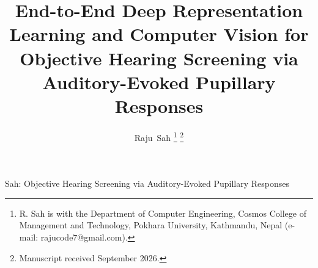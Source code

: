 \documentclass[journal]{IEEEtran}
\begin{document}
\title{End-to-End Deep Representation Learning and Computer Vision for Objective Hearing Screening via Auditory-Evoked Pupillary Responses}

\author{Raju~Sah%
\thanks{R. Sah is with the Department of Computer Engineering, Cosmos College of Management and Technology, Pokhara University, Kathmandu, Nepal (e-mail: rajucode7@gmail.com).}%
\thanks{Manuscript received September 2026.}%
}

%
{Sah: Objective Hearing Screening via Auditory-Evoked Pupillary Responses}

\maketitle
\end{document}
